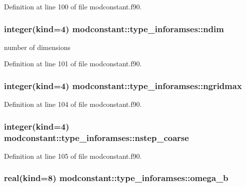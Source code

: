 Definition at line 100 of file modconstant.\-f90.

\hypertarget{structmodconstant_1_1type__inforamses_adf9bb7fc0490aa3a630c9fd7944148a0}{
\subsubsection[{ndim}]{\setlength{\rightskip}{0pt plus 5cm}integer(kind=4) modconstant\-::type\-\_\-inforamses\-::ndim}}\label{structmodconstant_1_1type__inforamses_adf9bb7fc0490aa3a630c9fd7944148a0}


number of dimensions 



Definition at line 101 of file modconstant.\-f90.

\hypertarget{structmodconstant_1_1type__inforamses_a62f64ba9a767a47ca65c383b250c112b}{
\subsubsection[{ngridmax}]{\setlength{\rightskip}{0pt plus 5cm}integer(kind=4) modconstant\-::type\-\_\-inforamses\-::ngridmax}}\label{structmodconstant_1_1type__inforamses_a62f64ba9a767a47ca65c383b250c112b}


Definition at line 104 of file modconstant.\-f90.

\hypertarget{structmodconstant_1_1type__inforamses_a4ac1ad3a415d2865fb8b42e6fa6c2769}{
\subsubsection[{nstep\-\_\-coarse}]{\setlength{\rightskip}{0pt plus 5cm}integer(kind=4) modconstant\-::type\-\_\-inforamses\-::nstep\-\_\-coarse}}\label{structmodconstant_1_1type__inforamses_a4ac1ad3a415d2865fb8b42e6fa6c2769}


Definition at line 105 of file modconstant.\-f90.

\hypertarget{structmodconstant_1_1type__inforamses_a1a5ae70e575367446fa1a0b9346d8d62}{
\subsubsection[{omega\-\_\-b}]{\setlength{\rightskip}{0pt plus 5cm}real(kind=8) modconstant\-::type\-\_\-inforamses\-::omega\-\_\-b}}\label{structmodconstant_1_1type__inforamses_a1a5ae70e575367446fa1a0b9346d8d62}


